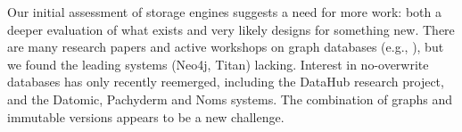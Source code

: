 \documentclass{sig-alternate}
\begin{document}


Our initial assessment of storage engines suggests a need for more work: both a deeper evaluation of what exists and very likely designs for something new. There are many research papers and active workshops on graph databases (e.g., \cite{grades16}), but we found the leading systems (Neo4j, Titan) lacking. 
Interest in no-overwrite databases has only recently reemerged, including the DataHub research project, and the Datomic, Pachyderm and Noms systems.  The combination of graphs and immutable versions
appears to be a new challenge.


\end{document}
